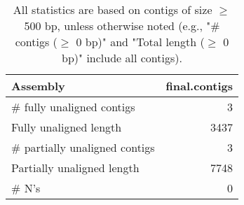 \documentclass[12pt,a4paper]{article}
\begin{document}
\begin{table}[ht]
\begin{center}
\caption{All statistics are based on contigs of size $\geq$ 500 bp, unless otherwise noted (e.g., "\# contigs ($\geq$ 0 bp)" and "Total length ($\geq$ 0 bp)" include all contigs).}
\begin{tabular}{|l*{1}{|r}|}
\hline
Assembly & final.contigs \\ \hline
\# fully unaligned contigs & 3 \\ \hline
Fully unaligned length & 3437 \\ \hline
\# partially unaligned contigs & 3 \\ \hline
Partially unaligned length & 7748 \\ \hline
\# N's & 0 \\ \hline
\end{tabular}
\end{center}
\end{table}
\end{document}
